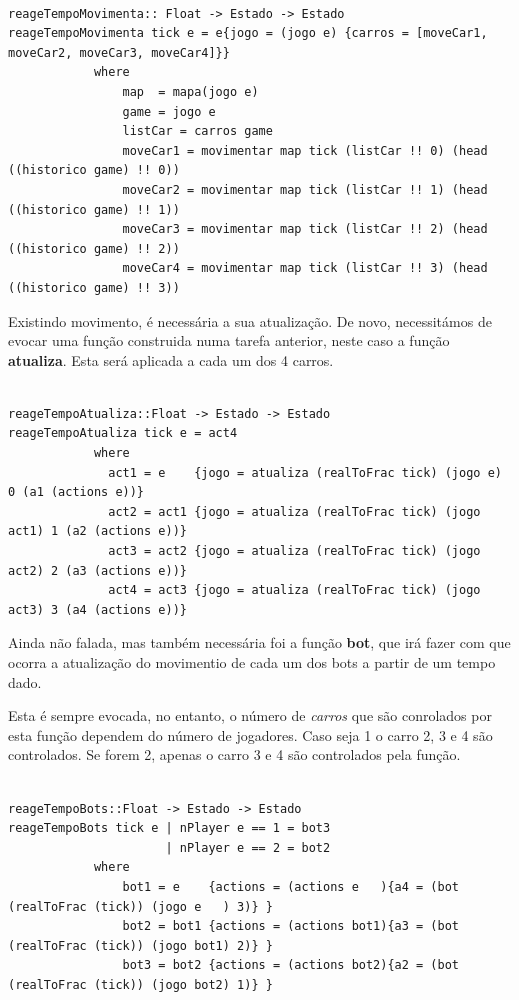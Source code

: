 \documentclass[a4paper]{report} %
\begin{document}
\begin{verbatim}

reageTempoMovimenta:: Float -> Estado -> Estado
reageTempoMovimenta tick e = e{jogo = (jogo e) {carros = [moveCar1, moveCar2, moveCar3, moveCar4]}}
            where
                map  = mapa(jogo e)
                game = jogo e
                listCar = carros game
                moveCar1 = movimentar map tick (listCar !! 0) (head ((historico game) !! 0))  
                moveCar2 = movimentar map tick (listCar !! 1) (head ((historico game) !! 1))
                moveCar3 = movimentar map tick (listCar !! 2) (head ((historico game) !! 2))
                moveCar4 = movimentar map tick (listCar !! 3) (head ((historico game) !! 3))

\end{verbatim}

\normalsize

Existindo movimento, é necessária a sua atualização. De novo, necessitámos de evocar uma função construida numa tarefa anterior, neste caso a função \textbf{atualiza}. Esta será aplicada a cada um dos 4 carros.

\scriptsize

\begin{verbatim}

reageTempoAtualiza::Float -> Estado -> Estado
reageTempoAtualiza tick e = act4
            where
              act1 = e    {jogo = atualiza (realToFrac tick) (jogo e)    0 (a1 (actions e))}
              act2 = act1 {jogo = atualiza (realToFrac tick) (jogo act1) 1 (a2 (actions e))} 
              act3 = act2 {jogo = atualiza (realToFrac tick) (jogo act2) 2 (a3 (actions e))}
              act4 = act3 {jogo = atualiza (realToFrac tick) (jogo act3) 3 (a4 (actions e))}

\end{verbatim}

\normalsize

Ainda não falada, mas também necessária foi a função \textbf{bot}, que irá fazer com que ocorra a atualização do movimentio de cada um dos bots a partir de um tempo dado.


Esta é sempre evocada, no entanto, o número de \emph{carros} que são conrolados por esta função dependem do número de jogadores. Caso seja 1 o carro 2, 3 e 4 são controlados. Se forem 2, apenas o carro 3 e 4 são controlados pela função. 

\scriptsize

\begin{verbatim}

reageTempoBots::Float -> Estado -> Estado
reageTempoBots tick e | nPlayer e == 1 = bot3
                      | nPlayer e == 2 = bot2
            where
                bot1 = e    {actions = (actions e   ){a4 = (bot (realToFrac (tick)) (jogo e   ) 3)} }
                bot2 = bot1 {actions = (actions bot1){a3 = (bot (realToFrac (tick)) (jogo bot1) 2)} }
                bot3 = bot2 {actions = (actions bot2){a2 = (bot (realToFrac (tick)) (jogo bot2) 1)} }

\end{verbatim}
\end{document}

